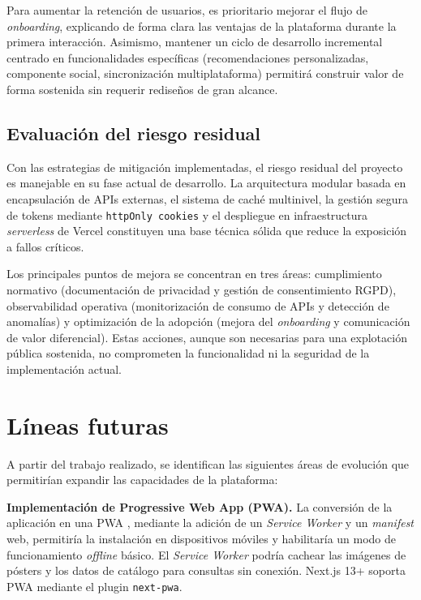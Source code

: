 Para aumentar la retención de usuarios, es prioritario mejorar el flujo de \textit{onboarding}, explicando de forma clara las ventajas de la plataforma durante la primera interacción. Asimismo, mantener un ciclo de desarrollo incremental centrado en funcionalidades específicas (recomendaciones personalizadas, componente social, sincronización multiplataforma) permitirá construir valor de forma sostenida sin requerir rediseños de gran alcance.

\subsection{Evaluación del riesgo residual}

Con las estrategias de mitigación implementadas, el riesgo residual del proyecto es manejable en su fase actual de desarrollo. La arquitectura modular basada en encapsulación de APIs externas, el sistema de caché multinivel, la gestión segura de tokens mediante \texttt{httpOnly cookies} y el despliegue en infraestructura \textit{serverless} de Vercel constituyen una base técnica sólida que reduce la exposición a fallos críticos.

Los principales puntos de mejora se concentran en tres áreas: cumplimiento normativo (documentación de privacidad y gestión de consentimiento RGPD), observabilidad operativa (monitorización de consumo de APIs y detección de anomalías) y optimización de la adopción (mejora del \textit{onboarding} y comunicación de valor diferencial). Estas acciones, aunque son necesarias para una explotación pública sostenida, no comprometen la funcionalidad ni la seguridad de la implementación actual.

\section{Líneas futuras}

A partir del trabajo realizado, se identifican las siguientes áreas de evolución que permitirían expandir las capacidades de la plataforma:

\textbf{Implementación de Progressive Web App (PWA).} La conversión de la aplicación en una PWA \parencite{W3C:2024}, mediante la adición de un \textit{Service Worker} \parencite{MDN:2024c} y un \textit{manifest} web, permitiría la instalación en dispositivos móviles y habilitaría un modo de funcionamiento \textit{offline} básico. El \textit{Service Worker} podría cachear las imágenes de pósters y los datos de catálogo para consultas sin conexión. Next.js 13+ soporta PWA mediante el plugin \texttt{next-pwa}.

